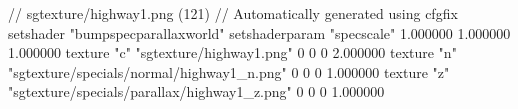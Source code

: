 // sgtexture/highway1.png (121)
// Automatically generated using cfgfix
setshader "bumpspecparallaxworld"
setshaderparam "specscale" 1.000000 1.000000 1.000000
texture "c" "sgtexture/highway1.png" 0 0 0 2.000000
texture "n" "sgtexture/specials/normal/highway1_n.png" 0 0 0 1.000000
texture "z" "sgtexture/specials/parallax/highway1_z.png" 0 0 0 1.000000

